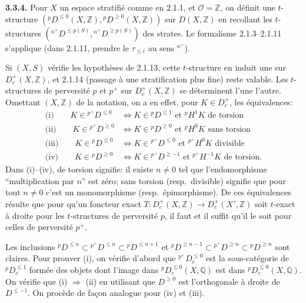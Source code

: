 \documentclass[12pt,a4paper]{article}
\theoremstyle{plain}
\theoremstyle{definition}
\newcommand{\cO}{\mathcal{O}}
\providecommand{\cO}{\mathcal{O}}
\begin{document}
\noindent\textbf{3.3.4.} Pour $X$ un espace stratifi\'{e} comme en 2.1.1, et $\cO = \mathbb{Z}$, on d\'{e}finit une $t$-structure $({}^{p}D^{\leq 0}(X,\mathbb{Z}), {}^{p}D^{\geq 0}(X,\mathbb{Z}))$ sur $D(X,\mathbb{Z})$ en recollant les $t$-structures $(\phantom{}^{n^{+}}D^{\leq p(S)}, \phantom{}^{n^{+}}D^{\geq p(S)})$ des strates. Le formalisme 2.1.3--2.1.11 s'applique (dans 2.1.11, prendre le $\tau_{\leq i}$ au sens $\phantom{}^{n^{+}}$).

Si $(X,S)$ v\'{e}rifie les hypoth\`{e}ses de 2.1.13, cette $t$-structure en induit une sur $D_{c}^{+}(X,\mathbb{Z})$, et 2.1.14 (passage \`{a} une stratification plus fine) reste valable. Les $t$-structures de perversit\'{e} $p$ et $p^{+}$ sur $D_{c}^{+}(X,\mathbb{Z})$ se d\'{e}terminent l'une l'autre. Omettant $(X,\mathbb{Z})$ de la notation, on a en effet, pour $K \in D_{c}^{+}$, les \'{e}quivalences:
\begin{align*}
\text{(i)}\qquad K \in {}^{p^{+}}D^{\leq 0} &\iff K \in {}^{p}D^{\leq 1} \text{ et } {}^{p}H^{1}K \text{ de torsion} \\
\text{(ii)}\qquad K \in {}^{p^{+}}D^{\geq 0} &\iff K \in {}^{p}D^{\geq 0} \text{ et } {}^{p}H^{0}K \text{ sans torsion} \\
\text{(iii)}\qquad K \in {}^{p}D^{\leq 0} &\iff K \in {}^{p^{+}}D^{\leq 0} \text{ et } {}^{p^{+}}H^{0}K \text{ divisible} \\
\text{(iv)}\qquad K \in {}^{p}D^{\geq 0} &\iff K \in {}^{p^{+}}D^{\geq -1} \text{ et } {}^{p^{+}}H^{-1}K \text{ de torsion.}
\end{align*}
Dans (i)--(iv), de torsion signifie: il existe $n \neq 0$ tel que l'endomorphisme ``multiplication par $n$'' est z\'{e}ro; sans torsion (resp.\ divisible) signifie que pour tout $n \neq 0$ c'est un monomorphisme (resp.\ \'{e}pimorphisme). De ces \'{e}quivalences r\'{e}sulte que pour qu'un foncteur exact $T: D_{c}^{+}(X,\mathbb{Z}) \longrightarrow D_{c}^{+}(X',\mathbb{Z})$ soit $t$-exact \`{a} droite pour les $t$-structures de perversit\'{e} $p$, il faut et il suffit qu'il le soit pour celles de perversit\'{e} $p^{+}$.

Les inclusions ${}^{p}D^{\leq n} \subset {}^{p^{+}}D^{\leq n} \subset {}^{p}D^{\leq n+1}$ et ${}^{p}D^{\geq n-1} \subset {}^{p^{+}}D^{\geq n} \subset {}^{p}D^{\geq n}$ sont claires. Pour prouver (i), on v\'{e}rifie d'abord que ${}^{p^{+}}D_{c}^{\leq 0}$ est la sous-cat\'{e}gorie de ${}^{p}D_{c}^{\leq 1}$ form\'{e}e des objets dont l'image dans ${}^{p}D_{c}^{\leq 0}(X,\mathbb{Q})$ est dans ${}^{p}D_{c}^{\leq 0}(X,\mathbb{Q})$. On v\'{e}rifie que (i) $\Rightarrow$ (ii) en utilisant que $D^{\geq 0}$ est l'orthogonale \`{a} droite de $D^{\leq -1}$. On proc\`{e}de de fa\c{c}on analogue pour (iv) et (iii).
\end{document}
